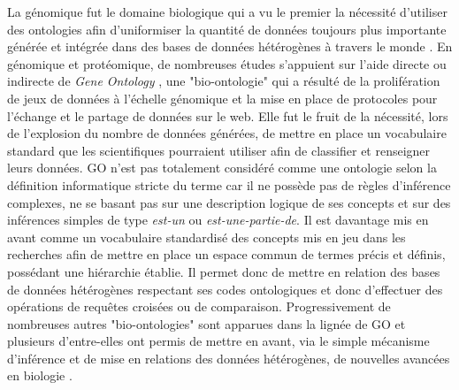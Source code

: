 La génomique fut le domaine biologique qui a vu le premier la nécessité d'utiliser des ontologies afin d'uniformiser la quantité de données toujours plus importante générée et intégrée dans des bases de données hétérogènes à travers le monde \cite{schuurman_ontologies_2008}.
En génomique et protéomique, de nombreuses études s'appuient sur l'aide directe ou indirecte de \textit{Gene Ontology} \cite{ashburner_gene_2000}, une "bio-ontologie" qui a résulté de la prolifération de jeux de données à l'échelle génomique et la mise en place de protocoles pour l'échange et le partage de données sur le web. Elle fut le fruit de la nécessité, lors de l'explosion du nombre de données générées, de mettre en place un vocabulaire standard que les scientifiques pourraient utiliser afin de classifier et renseigner leurs données. GO n'est pas totalement considéré comme une ontologie selon la définition informatique stricte du terme car il ne possède pas de règles d'inférence complexes, ne se basant pas sur une description logique de ses concepts et sur des inférences simples de type \textit{est-un} ou \textit{est-une-partie-de}. Il est davantage mis en avant comme un vocabulaire standardisé des concepts mis en jeu dans les recherches afin de mettre en place un espace commun de termes précis et définis, possédant une hiérarchie établie. Il permet donc de mettre en relation des bases de données hétérogènes respectant ses codes ontologiques et donc d'effectuer des opérations de requêtes croisées ou de comparaison. Progressivement de nombreuses autres "bio-ontologies" sont apparues dans la lignée de GO et plusieurs d'entre-elles ont permis de mettre en avant, via le simple mécanisme d'inférence et de mise en relations des données hétérogènes, de nouvelles avancées en biologie \cite{yoshikawa_drug_2004, stenzhorn_biotop_2008, smith_obo_2007}.

